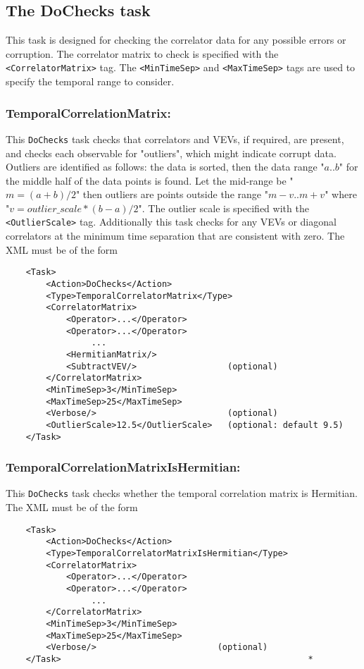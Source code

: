 \documentclass[12pt,notitlepage,letterpaper]{article}
\newcommand{\vb}{\texttt}
\begin{document}
\subsection{The DoChecks task}

This task is designed for checking the correlator data for any possible errors
or corruption.
The correlator matrix to check is specified with the \vb{<CorrelatorMatrix>} tag.
The \vb{<MinTimeSep>} and \vb{<MaxTimeSep>} tags are used to specify the temporal
range to consider.

\subsubsection{TemporalCorrelationMatrix:}
This \vb{DoChecks} task checks that correlators and VEVs, if required, are present,
and checks each observable for "outliers", which might indicate corrupt data.
Outliers are identified as follows: the data is sorted, then the data range "$a..b$"
for the middle half of the data points is found. 
Let the mid-range be "$m=(a+b)/2$" then outliers are points outside the range
"$m-v .. m+v$"  where "$v = outlier\_scale * (b-a)/2$".
The outlier scale is specified with the \vb{<OutlierScale>} tag.
Additionally this task checks for any VEVs or diagonal correlators
at the minimum time separation that are consistent with zero.
The XML must be of the form
\begin{verbatim}
    <Task>
        <Action>DoChecks</Action>
        <Type>TemporalCorrelatorMatrix</Type>
        <CorrelatorMatrix>
            <Operator>...</Operator>
            <Operator>...</Operator>
                 ...
            <HermitianMatrix/>
            <SubtractVEV/>                  (optional)
        </CorrelatorMatrix>
        <MinTimeSep>3</MinTimeSep>
        <MaxTimeSep>25</MaxTimeSep>
        <Verbose/>                          (optional)
        <OutlierScale>12.5</OutlierScale>   (optional: default 9.5)
    </Task>  
\end{verbatim}

\subsubsection{TemporalCorrelationMatrixIsHermitian:}
This \vb{DoChecks} task checks whether the temporal correlation matrix is Hermitian.
The XML must be of the form
\begin{verbatim}
    <Task>
        <Action>DoChecks</Action>
        <Type>TemporalCorrelatorMatrixIsHermitian</Type>
        <CorrelatorMatrix>
            <Operator>...</Operator>
            <Operator>...</Operator>
                 ...
        </CorrelatorMatrix>
        <MinTimeSep>3</MinTimeSep>
        <MaxTimeSep>25</MaxTimeSep>
        <Verbose/>                        (optional) 
    </Task>    											    *
\end{verbatim}
\end{document}

